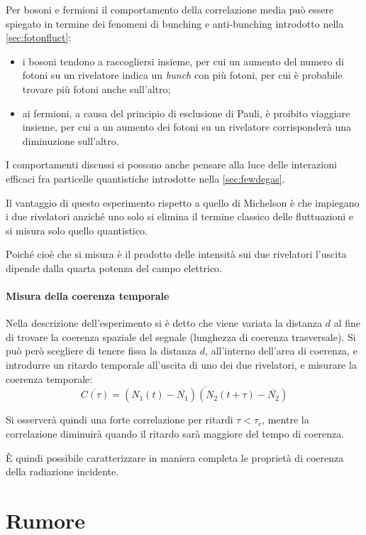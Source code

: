 Per bosoni e fermioni il comportamento della correlazione media può essere spiegato in termine dei fenomeni di bunching e anti-bunching introdotto nella \cref{sec:fotonfluct}:
\begin{itemize}
	\item i bosoni tendono a raccogliersi insieme, per cui un aumento del numero di fotoni su un rivelatore indica un \textit{bunch} con più fotoni, per cui è probabile trovare più fotoni anche sull'altro;
	\item ai fermioni, a causa del principio di esclusione di Pauli, è proibito viaggiare insieme, per cui a un aumento dei fotoni su un rivelatore corrisponderà una diminuzione sull'altro.
\end{itemize}
I comportamenti discussi si possono anche pensare alla luce delle interazioni efficaci fra particelle quantistiche introdotte nella \cref{sec:fewdegas}.
\newline

Il vantaggio di questo esperimento rispetto a quello di Michelson è che impiegano i due rivelatori anziché uno solo si elimina il termine classico delle fluttuazioni e si misura solo quello quantistico.

Poiché cioè che si misura è il prodotto delle intensità sui due rivelatori l'uscita dipende dalla quarta potenza del campo elettrico.

\paragraph{Misura della coerenza temporale} Nella descrizione dell'esperimento si è detto che viene variata la distanza $ d $ al fine di trovare la coerenza spaziale del segnale (lunghezza di coerenza trasversale).
Si può però scegliere di tenere fissa la distanza $ d $, all'interno dell'area di coerenza, e introdurre un ritardo temporale all'uscita di uno dei due rivelatori, e misurare la coerenza temporale:
\[ \overline{C(\tau)} = \overline{(N_1(t) - \overline{N_1})  (N_2(t+\tau) - \overline{N_2})} \]

Si osserverà quindi una forte correlazione per ritardi $ \tau < \tau_c $, mentre la correlazione diminuirà quando il ritardo sarà maggiore del tempo di coerenza.

\`E quindi possibile caratterizzare in maniera completa le proprietà di coerenza della radiazione incidente.

\section{Rumore}

